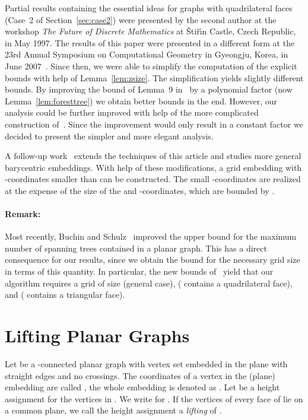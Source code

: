 \documentclass{article}
\theoremstyle{plain} \newtheorem{thm}{Theorem}[section]
\begin{document}
Partial results containing
the essential ideas for graphs with quadrilateral faces (Case~2
of Section~\ref{sec:case2}) were presented by the second author
at the workshop \emph{The Future of Discrete Mathematics}
at {\v Sti\v r\'\i n} Castle, Czech Republic, in May 1997.
The results of this paper were presented in a different form
at the 23rd Annual Symposium on Computational Geometry
 in Gyeongju, Korea, in June 2007~\cite{rrs-epsg-07}. Since then, we were able to simplify the computation of the explicit bounds with help of Lemma~\ref{lem:zsize}. The simplification yields slightly different bounds. 
By improving the bound of Lemma~9 in~\cite{rrs-epsg-07} by a polynomial factor (now  Lemma~\ref{lem:foresttree}) 
we obtain better bounds in the end.
However, our analysis could be further improved with help of the more complicated construction of~\cite{rrs-epsg-07}. 
Since the improvement would only result in a constant factor we decided to present the simpler and more elegant analysis. 

 A follow-up work~\cite{s-dpgvr-09} extends the techniques of this article
and studies more general barycentric embeddings.
With help of these modifications, a grid embedding with -coordinates
smaller than  can be constructed. The small -coordinates are
realized at the expense of the size of the  and -coordinates,
which are bounded by .


\paragraph{Remark:}
Most recently, Buchin and Schulz~\cite{BS10} improved the upper bound for the maximum number of spanning trees contained in a planar graph. 
This has a direct consequence for our results, since we obtain the bound for the necessary grid size in terms of this quantity. In particular, the new bounds of~\cite{BS10} yield that our algorithm requires a grid of size  (general case),  ( contains a quadrilateral face), and  ( contains a triangular face).





\section{Lifting Planar Graphs}
\label{sec:lifting}

Let  be a -connected planar graph with vertex set  embedded in the plane with straight edges and no crossings.
The coordinates of a vertex  in the (plane) embedding are called , the whole embedding is denoted as . 
Let  be a height assignment for the vertices in . We write  for .
If the vertices  of every face of  lie on a common plane, we call the height assignment  a \textit{lifting} of .
\end{document}
